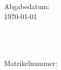{\begin{titlepage}
\begin{center}
            \ifdefined\handindate
                \large{Abgabedatum: \handindate\\}
            \else
                \large{\today\\} \fi
            
            
        \end{center}
        \vfill
        
        \begin{flushleft}
        \@author\\
        \ifdefined\authormail
            \href{mailto:\authormail}{\authormail}\\
        \else \\ \fi
        \ifdefined\matrikelnr
            {Matrikelnummer: \matrikelnr\\}
        \else \\ \fi
        \ifdefined\authoraddress
            \authoraddress\\
        \else \\ \fi
        \end{flushleft}
        
        \selectlanguage{\mainlanguage}
        \end{titlepage}
        
        \newpage
    }
\makeatother

\makeatletter         
    \renewcommand\maketitle{
        \selectlanguage{ngerman}
        \begin{flushleft}
            \@author\\
            \coursetype~\emph{\coursetitle}\\
            Kursnummer: \coursenumber\\
            \tutor\\
            \handindate
        \end{flushleft}
        
        \begin{center}
            \vspace{2em}
            \textsc{\huge{\@title}}\\[4ex]
        \end{center}
        \selectlanguage{\mainlanguage}
    } %
\makeatother

